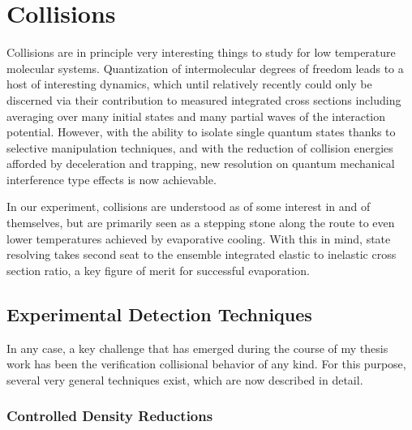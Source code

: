 \ifx\justbeingincluded\undefined

\fi

\chapter{Collisions}
\label{chapter:collisions}


Collisions are in principle very interesting things to study for low temperature molecular systems. 
Quantization of intermolecular degrees of freedom leads to a host of interesting dynamics, which until relatively recently could only be discerned via their contribution to measured integrated cross sections including averaging over many initial states and many partial waves of the interaction potential.
However, with the ability to isolate single quantum states thanks to selective manipulation techniques, and with the reduction of collision energies afforded by deceleration and trapping, new resolution on quantum mechanical interference type effects is now achievable.

In our experiment, collisions are understood as of some interest in and of themselves, but are primarily seen as a stepping stone along the route to even lower temperatures achieved by evaporative cooling.
With this in mind, state resolving takes second seat to the ensemble integrated elastic to inelastic cross section ratio, a key figure of merit for successful evaporation.

\section{Experimental Detection Techniques}

In any case, a key challenge that has emerged during the course of my thesis work has been the verification collisional behavior of any kind.
For this purpose, several very general techniques exist, which are now described in detail.

\subsection{Controlled Density Reductions}

